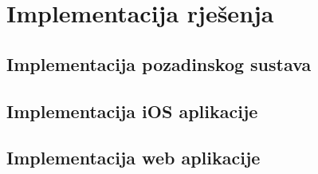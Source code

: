 \chapter{Implementacija rješenja}

\section{Implementacija pozadinskog sustava}

\section{Implementacija iOS aplikacije}




\section{Implementacija web aplikacije}
